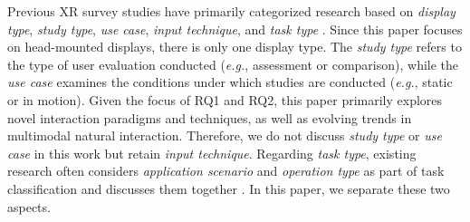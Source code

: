 \documentclass[review]{fcs}
\newcommand{\revise}[2]{\textcolor[rgb]{0,0,0}{#2}}
\begin{document}




\revise{}{Previous XR survey studies have primarily categorized research based on \textit{display type}, \textit{study type}, \textit{use case}, \textit{input technique}, and \textit{task type} \cite{DBLP:journals/vi/ZhangWZST23,DBLP:conf/ismar/HertelKSBSS21,DBLP:journals/tvcg/SpittlePC023}. Since this paper focuses on head-mounted displays, there is only one display type.  
The \textit{study type} refers to the type of user evaluation conducted (\textit{e.g.}, assessment or comparison), while the \textit{use case} examines the conditions under which studies are conducted (\textit{e.g.}, static or in motion). Given the focus of RQ1 and RQ2, this paper primarily explores novel interaction paradigms and techniques, as well as evolving trends in multimodal natural interaction. Therefore, we do not discuss \textit{study type} or \textit{use case} in this work but retain \textit{input technique}. 
Regarding \textit{task type}, existing research often considers \textit{application scenario} and \textit{operation type} as part of task classification and discusses them together \cite{DBLP:conf/ismar/HertelKSBSS21,DBLP:journals/tvcg/SpittlePC023}. In this paper, we separate these two aspects.}  
\end{document}
